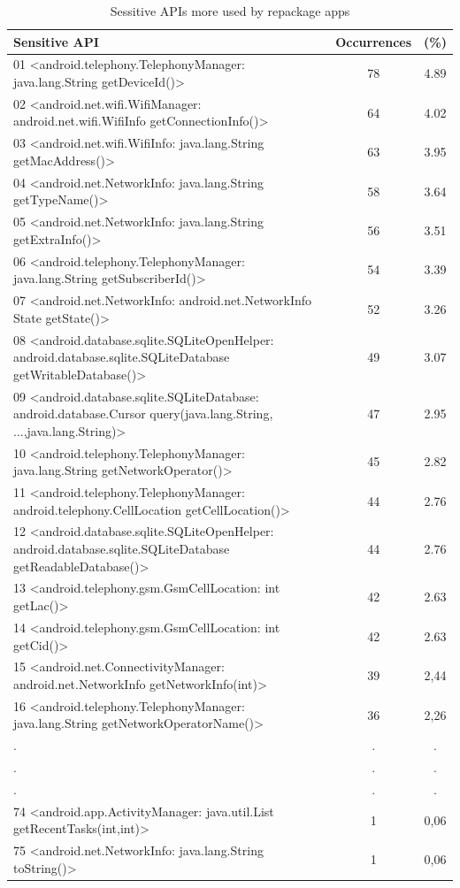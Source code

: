 \begin{table}[t]
  \caption{Sessitive APIs more used by repackage apps}
  \centering
  \begin{small}
 \begin{tabular}{lcc}
   \toprule
   Sensitive API & Occurrences & (\%) \\
   \midrule
   01 <android.telephony.TelephonyManager: java.lang.String getDeviceId()> &  78 & 4.89 \\
   02 <android.net.wifi.WifiManager: android.net.wifi.WifiInfo getConnectionInfo()> &  64 & 4.02 \\
   03 <android.net.wifi.WifiInfo: java.lang.String getMacAddress()> &  63 & 3.95 \\
   04 <android.net.NetworkInfo: java.lang.String getTypeName()> &  58 & 3.64 \\
   05 <android.net.NetworkInfo: java.lang.String getExtraInfo()> &  56 & 3.51 \\
   06 <android.telephony.TelephonyManager: java.lang.String getSubscriberId()> &  54 & 3.39 \\
   07 <android.net.NetworkInfo: android.net.NetworkInfo State getState()> &  52 & 3.26 \\
   08 <android.database.sqlite.SQLiteOpenHelper: android.database.sqlite.SQLiteDatabase getWritableDatabase()> &  49 & 3.07 \\
   09 <android.database.sqlite.SQLiteDatabase: android.database.Cursor query(java.lang.String, ...,java.lang.String)> &  47 & 2.95 \\
   10 <android.telephony.TelephonyManager: java.lang.String getNetworkOperator()> &  45 & 2.82 \\
   11 <android.telephony.TelephonyManager: android.telephony.CellLocation getCellLocation()> &  44 & 2.76 \\
   12 <android.database.sqlite.SQLiteOpenHelper: android.database.sqlite.SQLiteDatabase getReadableDatabase()> &  44 & 2.76 \\
   13 <android.telephony.gsm.GsmCellLocation: int getLac()> &  42 & 2.63 \\
   14 <android.telephony.gsm.GsmCellLocation: int getCid()> &  42 & 2.63 \\
   
   15 <android.net.ConnectivityManager: android.net.NetworkInfo getNetworkInfo(int)> &  39 & 2,44 \\
   16 <android.telephony.TelephonyManager: java.lang.String getNetworkOperatorName()> &  36 & 2,26 \\
   .&  . & . \\
   .&  . & . \\
   .&  . & . \\
   74 <android.app.ActivityManager: java.util.List getRecentTasks(int,int)> & 1 & 0,06 \\
   75 <android.net.NetworkInfo: java.lang.String toString()> & 1 & 0,06 \\


\end{tabular}
\end{small}
\end{table}
